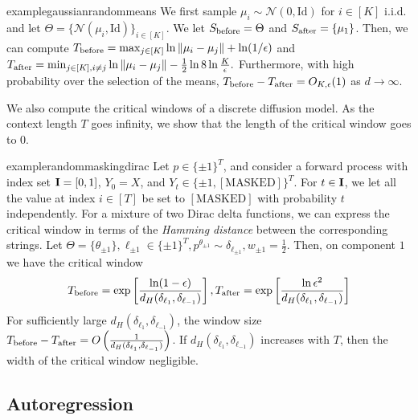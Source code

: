 \begin{restatable}{example}{gaussianrandommeans}\label{example:gaussianrandommeans} We first sample $\mu_i \sim \mathcal{N}(0,\mathrm{Id})$ for $i \in [K]$ i.i.d. and let $\Theta=\{\mathcal{N}(\mu_i,\mathrm{Id})\}_{i \in [K]}$. We let $S_{\mathrm{before}}=\Theta$ and $S_{\mathrm{after}}=\{\mu_1\}$. Then, we can compute $T_{\mathrm{before}} = \max_{j \in [K]} \ln \|\mu_i-\mu_j\|+\ln (1/\epsilon)$ and $T_{\mathrm{after}} = \min_{j \in [K],i\ne j} \ln \|\mu_i-\mu_j\| -\frac12\ln 8\ln \frac{K}{\epsilon}.$ Furthermore, with high probability over the selection of the means, $T_{\mathrm{before}}-T_{\mathrm{after}} = O_{K,\epsilon}(1)$ as $d \to \infty$. 
\end{restatable}
We also compute the critical windows of a discrete diffusion model. As the context length $T$ goes infinity, we show that the length of the critical window goes to $0$.
\begin{restatable}{example}{randommaskingdirac}\label{example:random_mask}  
Let $p \in \{\pm 1\}^T$, and consider a forward process with index set $\mathbf{I}=[0,1]$, $Y_0=X$, and $Y_t \in \{\pm 1,\mathrm{[MASKED]}\}^T$. For $t \in \mathbf{I}$, we let all the value at index $i \in [T]$ be set to $\mathrm{[MASKED]}$ with probability $t$ independently. For a mixture of two Dirac delta functions, we can express the critical window in terms of the \emph{Hamming distance} between the corresponding strings. Let $\Theta=\{\theta_{\pm 1}\}, \ell_{\pm 1} \in \{\pm 1\}^T, p^{\theta_{\pm 1}} \sim \delta_{\ell_{\pm 1}}, w_{\pm 1}=\frac{1}{2}$. Then, on component $1$ we have the critical window 
\begin{align}
T_{\mathrm{before}} = \exp\left[\frac{\ln (1-\epsilon)}{d_H(\delta_{\ell_{1}},\delta_{\ell_{-1}})}\right],T_{\mathrm{after}} = \exp\left[\frac{\ln \epsilon^2}{d_H(\delta_{\ell_{1}},\delta_{\ell_{-1}})}\right]
\end{align}
For sufficiently large $d_H(\delta_{\ell_{1}},\delta_{\ell_{-1}})$, the window size $T_{\mathrm{before}} -T_{\mathrm{after}}= O\left(\frac{1}{d_H(\delta_{\ell_{1}},\delta_{\ell_{-1}})}\right)$. If $d_H(\delta_{\ell_{1}},\delta_{\ell_{-1}})$ increases with $T$, then the width of the critical window negligible. 
\end{restatable}
\subsection{Autoregression}

